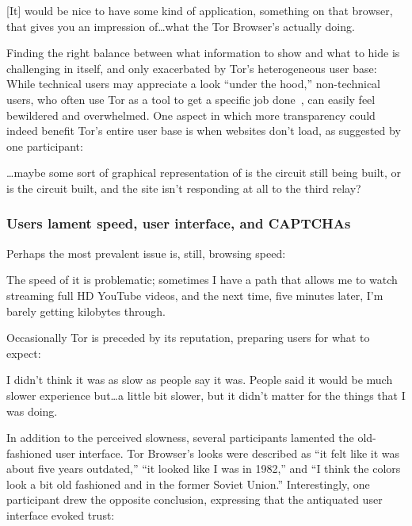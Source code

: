 \begin{displayquote}[P02]
{[It]} would be nice to have some kind of application, something on that browser,
that gives you an impression of\dots what the Tor Browser's actually doing.
\end{displayquote}

Finding the right balance between what information to show and what to hide is
challenging in itself, and only exacerbated by Tor's heterogeneous user base:
While technical users may appreciate a look ``under the hood,'' non-technical
users, who often use Tor as a tool to get a specific job
done~\cite[\S~4.3.2]{Gallagher2017a}, can easily feel bewildered and
overwhelmed.  One aspect in which more transparency could indeed benefit Tor's
entire user base is when websites don't load, as suggested by one participant:

\begin{displayquote}[P05]
\dots maybe some sort of graphical representation of is the circuit still
being built, or is the circuit built, and the site isn't responding at all to
the third relay?
\end{displayquote}

\subsubsection{Users lament speed, user interface, and CAPTCHAs}

Perhaps the most prevalent issue is, still, browsing speed:

\begin{displayquote}[P01]
The speed of it is problematic; sometimes I have a path that allows me to watch
streaming full HD YouTube videos, and the next time, five minutes later, I'm
barely getting kilobytes through.
\end{displayquote}

Occasionally Tor is preceded by its reputation, preparing users for what to
expect:

\begin{displayquote}[P03]
I didn't think it was as slow as people say it was. People said it would be much
slower experience but\ldots a little bit slower, but it didn't matter for the
things that I was doing.
\end{displayquote}

In addition to the perceived slowness, several participants lamented the
old-fashioned user interface.  Tor Browser's looks were described as ``it felt
like it was about five years outdated,'' ``it looked like I was in 1982,'' and
``I think the colors look a bit old fashioned and in the former Soviet Union.''
Interestingly, one participant drew the opposite conclusion, expressing that the
antiquated user interface evoked trust:

